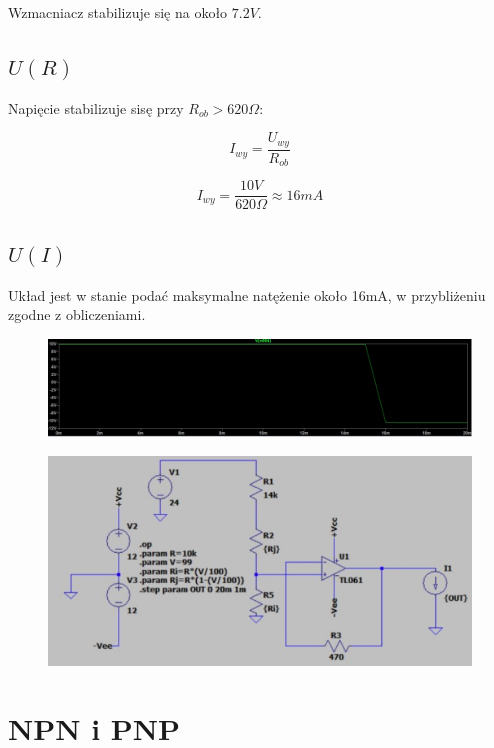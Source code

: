 \documentclass{article}
\begin{document}
Wzmacniacz stabilizuje się na około $7.2V$.


\subsection{$U(R)$}

Napięcie stabilizuje sisę przy $R_{ob} > 620 \Omega$:

$$
    I_{wy} = \frac{U_{wy}}{R_{ob}}
$$

$$
    I_{wy} = \frac{10V}{620\Omega}\approx 16mA
$$


\subsection{$U(I)$}

Układ jest w stanie podać maksymalne natężenie około 16mA, w przybliżeniu zgodne z obliczeniami.

\begin{figure}[h!]
    \centering
    \includegraphics[scale=0.35]{rys2_wykres.jpg}
\end{figure}
\newpage
\begin{figure}[h!]
    \centering
    \includegraphics{rys2_model.jpg}
\end{figure}

\newpage

\section{NPN i PNP}
\end{document}
